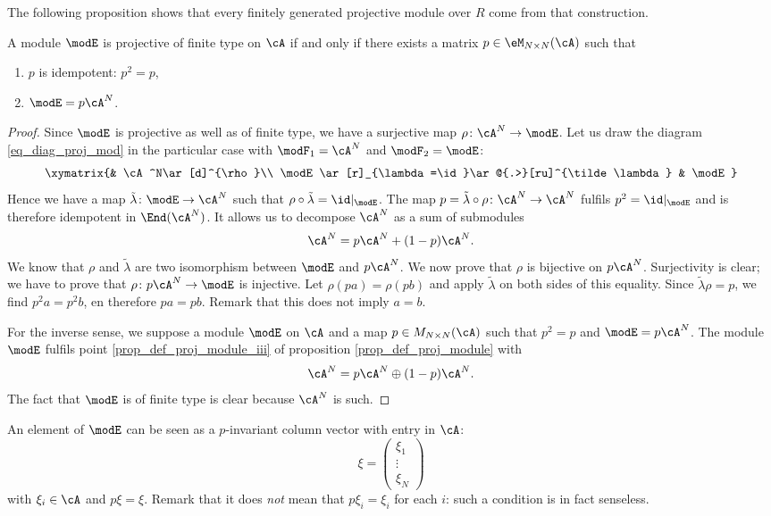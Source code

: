 The following proposition shows that every finitely generated projective module over $R$ come from that construction.
\begin{proposition}
A module $\modE$ is projective of finite type on $\cA$ if and only if there exists a matrix $p\in \eM_{N\times N}(\cA)$ such that
\begin{enumerate}
\item $p$ is idempotent: $p^2=p$,
\item $\modE=p\cA^N$.
\end{enumerate}

\end{proposition}

\begin{proof}

Since $\modE$ is projective as well as of finite type, we have a surjective map $\rho\colon \cA^N\to \modE$. Let us draw the diagram \eqref{eq_diag_proj_mod} in the particular case with $\modF_1=\cA^N$ and $\modF_2=\modE$: 
\begin{equation}
\xymatrix{%
						   		&	\cA^N\ar[d]^{\rho}\\
   \modE \ar[r]_{\lambda=\id}\ar@{.>}[ru]^{\tilde\lambda}	&	\modE
}
\end{equation}
Hence we have a map $\tilde\lambda\colon \modE\to \cA^N$ such that $\rho\circ\tilde\lambda=\id|_{\modE}$. The map $p=\tilde\lambda\circ\rho\colon \cA^N\to \cA^N$ fulfils $p^2=\id|_{\modE}$ and is therefore idempotent in $\End(\cA^N)$. It allows us to decompose $\cA^N$ as a sum of submodules
\[ 
  \cA^N=p\cA^N+(1-p)\cA^N.
\]
We know that $\rho$ and $\tilde\lambda$ are two isomorphism between $\modE$ and $p\cA^N$. We now prove that $\rho$ is bijective on $p\cA^N$. Surjectivity is clear; we have to prove that $\rho\colon p\cA^N\to \modE$ is injective. Let $\rho(pa)=\rho(pb)$ and apply $\tilde\lambda$ on both sides of this equality. Since $\tilde\lambda\rho=p$, we find $p^2a=p^2b$, en therefore $pa=pb$. Remark that this does not imply $a=b$.

For the inverse sense, we suppose a module $\modE$ on $\cA$ and a map $p\in M_{N\times N}(\cA)$ such that $p^2=p$ and $\modE=p\cA^N$. The module $\modE$ fulfils point \ref{prop_def_proj_module_iii} of proposition \ref{prop_def_proj_module} with
\[ 
  \cA^N=p\cA^N\oplus(1-p)\cA^N.
\]  
The fact that $\modE$ is of finite type is clear because $\cA^N$ is such.

\end{proof}
An element of $\modE$ can be seen as a $p$-invariant column vector with entry in $\cA$:
\[ 
  \xi=
\begin{pmatrix}
\xi_1\\\vdots\\\xi_N
\end{pmatrix}
\]
with $\xi_i\in\cA$ and $p\xi=\xi$. Remark that it does \emph{not} mean that $p\xi_i=\xi_i$ for each $i$: such a condition is in fact senseless.

